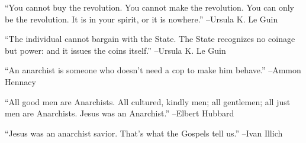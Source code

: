 \documentclass{article}%
\begin{document}
\linebreak%
\vspace{1mm}%
\begin{minipage}{\textwidth}%
\flushleft%
“You cannot buy the revolution. You cannot make the revolution. You can only be the revolution. It is in your spirit, or it is nowhere.”%
\linebreak%
\vspace{1mm}%
–Ursula K. Le Guin%
\linebreak%
\vspace{1mm}%
\end{minipage}%
\linebreak%
\vspace{1mm}%
\begin{minipage}{\textwidth}%
\flushleft%
“The individual cannot bargain with the State. The State recognizes no coinage but power: and it issues the coins itself.”%
\linebreak%
\vspace{1mm}%
–Ursula K. Le Guin%
\linebreak%
\vspace{1mm}%
\end{minipage}%
\linebreak%
\vspace{1mm}%
\begin{minipage}{\textwidth}%
\flushleft%
“An anarchist is someone who doesn't need a cop to make him behave.”%
\linebreak%
\vspace{1mm}%
–Ammon Hennacy%
\linebreak%
\vspace{1mm}%
\end{minipage}%
\linebreak%
\vspace{1mm}%
\begin{minipage}{\textwidth}%
\flushleft%
“All good men are Anarchists. All cultured, kindly men; all gentlemen; all just men are Anarchists. Jesus was an Anarchist.”%
\linebreak%
\vspace{1mm}%
–Elbert Hubbard%
\linebreak%
\vspace{1mm}%
\end{minipage}%
\linebreak%
\vspace{1mm}%
\begin{minipage}{\textwidth}%
\flushleft%
“Jesus was an anarchist savior. That's what the Gospels tell us.”%
\linebreak%
\vspace{1mm}%
–Ivan Illich%
\linebreak%
\vspace{1mm}%
\end{minipage}%
\end{document}
